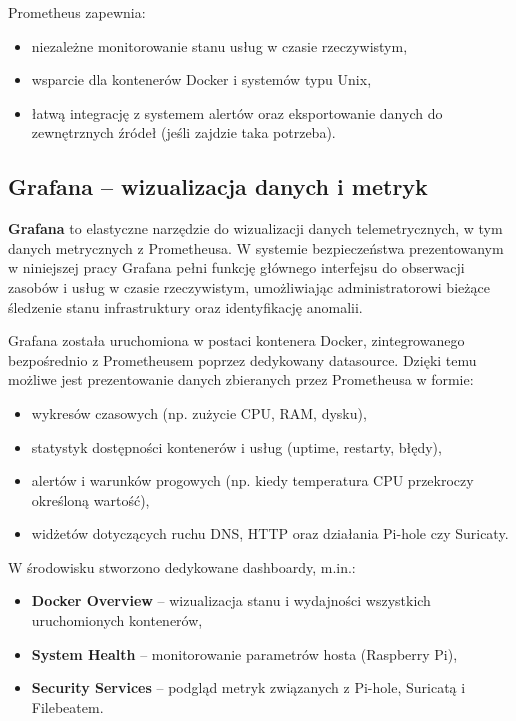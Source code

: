 \documentclass[
    left=2.5cm,         %
    right=2.5cm,        %
    top=2.5cm,          %
    bottom=3cm,         %
    bindingoffset=6mm,  %
    nohyphenation=true %
]{eiti/eiti-thesis} %
\begin{document}
Prometheus zapewnia:
\begin{itemize}
    \item niezależne monitorowanie stanu usług w czasie rzeczywistym,
    \item wsparcie dla kontenerów Docker i systemów typu Unix,
    \item łatwą integrację z systemem alertów oraz eksportowanie danych do zewnętrznych źródeł (jeśli zajdzie taka potrzeba).
\end{itemize}

\subsection{Grafana – wizualizacja danych i metryk}

\textbf{Grafana}\cite{grafana-docs} to elastyczne narzędzie do wizualizacji danych telemetrycznych, w tym danych metrycznych z Prometheusa. W systemie bezpieczeństwa prezentowanym w niniejszej pracy Grafana pełni funkcję głównego interfejsu do obserwacji zasobów i usług w czasie rzeczywistym, umożliwiając administratorowi bieżące śledzenie stanu infrastruktury oraz identyfikację anomalii.

Grafana została uruchomiona w postaci kontenera Docker, zintegrowanego bezpośrednio z Prometheusem poprzez dedykowany datasource. Dzięki temu możliwe jest prezentowanie danych zbieranych przez Prometheusa w formie:
\begin{itemize}
    \item wykresów czasowych (np. zużycie CPU, RAM, dysku),
    \item statystyk dostępności kontenerów i usług (uptime, restarty, błędy),
    \item alertów i warunków progowych (np. kiedy temperatura CPU przekroczy określoną wartość),
    \item widżetów dotyczących ruchu DNS, HTTP oraz działania Pi-hole czy Suricaty.
\end{itemize}

W środowisku stworzono dedykowane dashboardy, m.in.:
\begin{itemize}
    \item \textbf{Docker Overview} – wizualizacja stanu i wydajności wszystkich uruchomionych kontenerów,
    \item \textbf{System Health} – monitorowanie parametrów hosta (Raspberry Pi),
    \item \textbf{Security Services} – podgląd metryk związanych z Pi-hole, Suricatą i Filebeatem.
\end{itemize}
\end{document}
